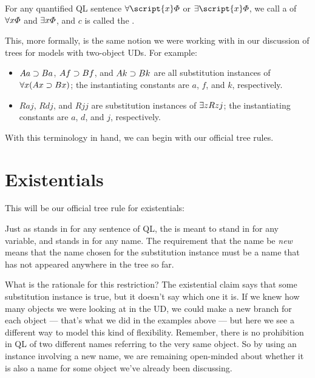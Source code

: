 For any quantified QL sentence $\qt{\forall}{\script{x}} \metaA{}$ or $\qt{\exists}{\script{x}} \metaA{}$, we call \metaA{} a  of $\forall x\varPhi{}$ and $\exists x\varPhi{}$, and $c$ is called the .

This, more formally, is the same notion we were working with in our discussion of trees for models with two-object UDs. For example:

\begin{itemize}
\item $Aa \supset Ba$, $Af \supset Bf$, and $Ak \supset Bk$ are all substitution instances of $\forall x(Ax \supset Bx)$; the instantiating constants are $a$, $f$, and $k$, respectively.
\item $Raj$, $Rdj$, and $Rjj$ are substitution instances of $\exists zRzj$; the instantiating constants are $a$, $d$, and $j$, respectively.
\end{itemize}

With this terminology in hand, we can begin with our official tree rules.

\section{Existentials}

This will be our official tree rule for existentials:


Just as \metaA{} stands in for any sentence of QL, the  is meant to stand in for any variable, and  stands in for any name. The requirement that the name be \emph{new} means that the name chosen for the substitution instance must be a name that has not appeared anywhere in the tree so far. 

What is the rationale for this restriction? The existential claim says that some substitution instance is true, but it doesn't say which one it is. If we knew how many objects we were looking at in the UD, we could make a new branch for each object --- that's what we did in the examples above --- but here we see a different way to model this kind of flexibility. Remember, there is no prohibition in QL of two different names referring to the very same object. So by using an instance involving a new name, we are remaining open-minded about whether it is also a name for some object we've already been discussing.

